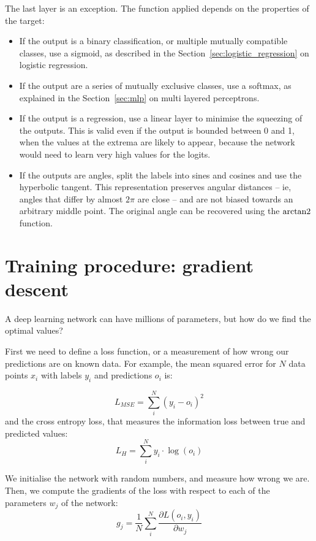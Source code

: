 The last layer is an exception.
The function applied depends on the properties of the target:
\begin{itemize}
\item If the output is a binary classification, or multiple mutually compatible classes, use a sigmoid, as described in the Section~\ref{sec:logistic_regression} on logistic regression.
\item If the output are a series of mutually exclusive classes, use a softmax, as explained in the Section~\ref{sec:mlp} on multi layered perceptrons.
\item If the output is a regression, use a linear layer to minimise the squeezing of the outputs.
This is valid even if the output is bounded between 0 and 1, when the values at the extrema are likely to appear, because the network would need to learn very high values for the logits.
\item If the outputs are angles, split the labels into sines and cosines and use the hyperbolic tangent.
This representation preserves angular distances -- ie, angles that differ by almost $2 \pi$ are close -- and are not biased towards an arbitrary middle point.
The original angle can be recovered using the $\operatorname{arctan2}$ function.
\end{itemize}

\section[Gradient descent]{Training procedure: gradient descent}\label{sec:grad_descent}
A deep learning network can have millions of parameters, but how do we find the optimal values?

First we need to define a loss function, or a measurement of how wrong our predictions are on known data.
For example, the mean squared error for $N$ data points  $x_i$ with labels $y_i$ and predictions $o_i$ is:

\begin{equation*}
L_{MSE} = \sum_i^N \left(y_i - o_i\right)^2
\end{equation*}
and the cross entropy loss, that measures the information loss between true and predicted values:
\begin{equation*}
L_{H} = \sum_i^N y_i \cdot \log\left(o_i\right) 
\end{equation*}

We initialise the network with random numbers, and measure how wrong we are.
Then, we compute the gradients of the loss with respect to each of the parameters $w_j$ of the network:
\begin{equation*}
g_j = \frac{1}{N}\sum_i^N\frac{\partial L\left(o_i, y_i \right)}{\partial w_j}
\end{equation*}

